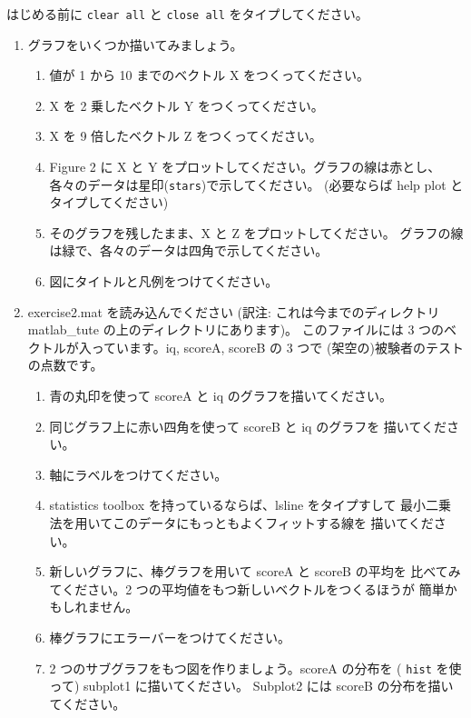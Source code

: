 \documentclass{jsarticle}
\begin{document}
\begin{boxnote}
はじめる前に {\tt clear all} と {\tt close all} をタイプしてください。

\begin{enumerate}
\item グラフをいくつか描いてみましょう。

	\begin{enumerate}
	\item 値が 1 から 10 までのベクトル X をつくってください。
	\item X を 2 乗したベクトル Y をつくってください。
	\item X を 9 倍したベクトル Z をつくってください。
	\item Figure 2 に X と Y をプロットしてください。グラフの線は赤とし、
	各々のデータは星印({\tt stars})で示してください。
	(必要ならば help plot とタイプしてください)
	\item そのグラフを残したまま、X と Z をプロットしてください。
	グラフの線は緑で、各々のデータは四角で示してください。
	\item 図にタイトルと凡例をつけてください。
	\end{enumerate}

\item exercise2.mat を読み込んでください
(訳注: これは今までのディレクトリ matlab\_tute の上のディレクトリにあります)。
このファイルには 3 つのベクトルが入っています。iq, scoreA, scoreB の 3 つで
(架空の)被験者のテストの点数です。

	\begin{enumerate}
	\item 青の丸印を使って scoreA と iq のグラフを描いてください。
	\item 同じグラフ上に赤い四角を使って scoreB と iq のグラフを
	描いてください。
	\item 軸にラベルをつけてください。
	\item statistics toolbox を持っているならば、lsline をタイプすして
	最小二乗法を用いてこのデータにもっともよくフィットする線を
	描いてください。
	\item 新しいグラフに、棒グラフを用いて scoreA と scoreB の平均を
	比べてみてください。2 つの平均値をもつ新しいベクトルをつくるほうが
	簡単かもしれません。
	\item 棒グラフにエラーバーをつけてください。
	\item 2 つのサブグラフをもつ図を作りましょう。scoreA の分布を
	( {\tt hist} を使って) subplot1 に描いてください。
	Subplot2 には scoreB の分布を描いてください。
	\end{enumerate}

\end{enumerate}
\end{boxnote}
\end{document}
